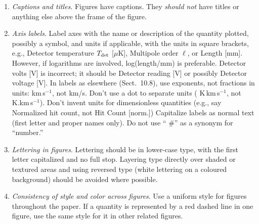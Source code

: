\documentclass[letterpaper,11pt]{article}
\begin{document}
\begin{enumerate}
Sky images should always have coordinates indicated by a labelled frame or
graticule.  Use sexagesimal notation (e.g., h,m,s of RA and d,m,s of Dec) or
decimal degrees, but do not mix the two: if you refer to a source RA of
$12^{\rm h}\,30^{\rm m}$ in the text or a table, do not use 187.5\degree in a
figure!

\item {\it Captions and titles\/}.  Figures have captions.  They {\it should
not\/} have titles or anything else above the frame of the figure.

\item {\it Axis labels\/}. Label axes with the name or description of the
quantity plotted, possibly a symbol, and units if applicable, with the units
in square brackets, e.g., { Detector temperature $T_{\rm det}$ [$\mu$K]},
{ Multipole order $\ell$}, or { Length [mm]}.  However, if logarithms
are involved, { log(length/mm)} is preferable.  { Detector volts [V]}
is incorrect; it should be { Detector reading [V]} or possibly
{ Detector voltage [V]}.  In labels as elsewhere (Sect.~10.8), use exponents,
not fractions in units: { km\,s$^{-1}$}, not { km/s}.  Don't use a dot
to separate units ({ K\,km\,s$^{-1}$}, not { K.km\,s$^{-1}$}).  Don't
invent units for dimensionless quantities (e.g., say { Normalized hit
count}, not { Hit Count [norm.]})  Capitalize labels as normal text (first
letter and proper names only).  Do not use ``{ \#}'' as a synonym for
``number.''

\item {\it Lettering in figures\/}.  Lettering should be in lower-case type,
with the first letter capitalized and no full stop.  Layering type directly
over shaded or textured areas and using reversed type (white lettering on a
coloured background) should be avoided where possible.


\item {\it Consistency of style and color across figures\/}.  Use a uniform
style for figures throughout the paper.  If a quantity is represented by a red
dashed line in one figure, use the same style for it in other related figures.  


\end{enumerate}
\end{document}
